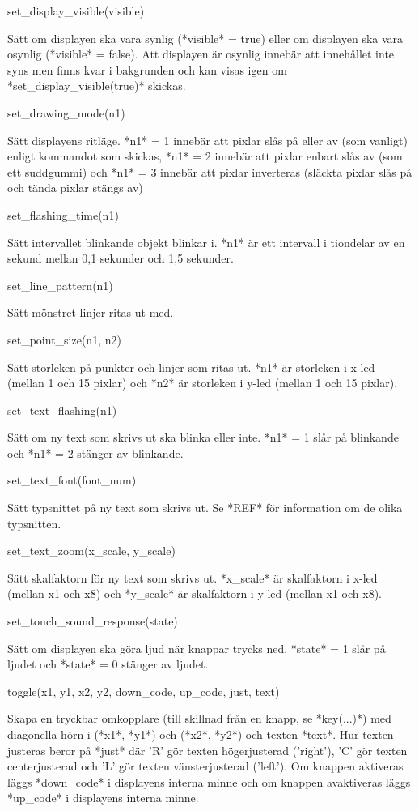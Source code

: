 \documentclass[10pt,oneside,swedish]{lips-no_customer}
\begin{document}
set\_display\_visible(visible)

Sätt om displayen ska vara synlig (*visible* = true) eller om displayen
ska vara osynlig (*visible* = false). Att displayen är osynlig innebär
att innehållet inte syns men finns kvar i bakgrunden och kan visas igen
om *set\_display\_visible(true)* skickas.

set\_drawing\_mode(n1)

Sätt displayens ritläge. *n1* = 1 innebär att pixlar slås på eller av
(som vanligt) enligt kommandot som skickas, *n1* = 2 innebär att pixlar
enbart slås av (som ett suddgummi) och *n1* = 3 innebär att pixlar
inverteras (släckta pixlar slås på och tända pixlar stängs av)

set\_flashing\_time(n1)

Sätt intervallet blinkande objekt blinkar i. *n1* är ett intervall i
tiondelar av en sekund mellan 0,1 sekunder och 1,5 sekunder.

set\_line\_pattern(n1)

Sätt mönstret linjer ritas ut med.

set\_point\_size(n1, n2)

Sätt storleken på punkter och linjer som ritas ut. *n1* är storleken i
x-led (mellan 1 och 15 pixlar) och *n2* är storleken i y-led (mellan 1
och 15 pixlar).

set\_text\_flashing(n1)

Sätt om ny text som skrivs ut ska blinka eller inte. *n1* = 1 slår på
blinkande och *n1* = 2 stänger av blinkande.

set\_text\_font(font\_num)

Sätt typsnittet på ny text som skrivs ut. Se *REF* för information om de
olika typsnitten.

set\_text\_zoom(x\_scale, y\_scale)

Sätt skalfaktorn för ny text som skrivs ut. *x\_scale* är skalfaktorn i
x-led (mellan x1 och x8) och *y\_scale* är skalfaktorn i y-led (mellan
x1 och x8).

set\_touch\_sound\_response(state)

Sätt om displayen ska göra ljud när knappar trycks ned. *state* = 1 slår
på ljudet och *state* = 0 stänger av ljudet.

toggle(x1, y1, x2, y2, down\_code, up\_code, just, text)

Skapa en tryckbar omkopplare (till skillnad från en knapp, se
*key(...)*) med diagonella hörn i (*x1*, *y1*) och (*x2*, *y2*) och
texten *text*. Hur texten justeras beror på *just* där 'R' gör texten
högerjusterad ('right'), 'C' gör texten centerjusterad och 'L' gör
texten vänsterjusterad ('left'). Om knappen aktiveras läggs *down\_code*
i displayens interna minne och om knappen avaktiveras läggs *up\_code* i
displayens interna minne.
\end{document}
